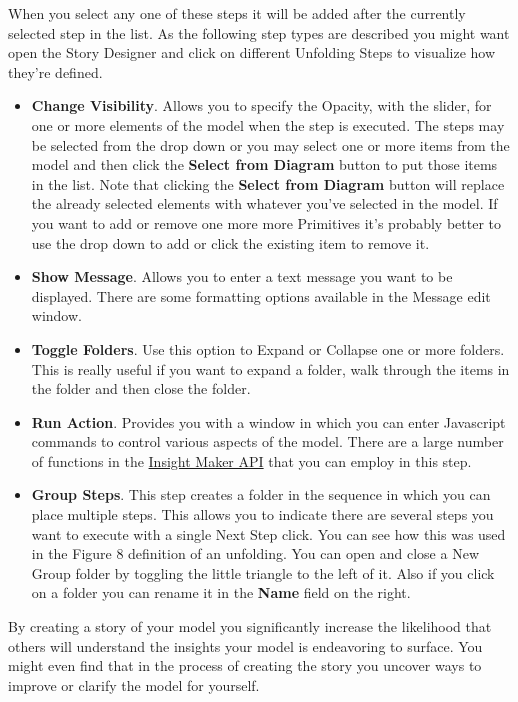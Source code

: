 \documentclass[]{memoir}
\begin{document}
When you select any one of these steps it will be added after the
currently selected step in the list. As the following step types are
described you might want open the Story Designer and click on different
Unfolding Steps to visualize how they're defined.

\begin{itemize}
\itemsep1pt\parskip0pt
\item
  \textbf{Change Visibility}. Allows you to specify the Opacity, with
  the slider, for one or more elements of the model when the step is
  executed. The steps may be selected from the drop down or you may
  select one or more items from the model and then click the
  \textbf{Select from Diagram} button to put those items in the list.
  Note that clicking the \textbf{Select from Diagram} button will
  replace the already selected elements with whatever you've selected in
  the model. If you want to add or remove one more more Primitives it's
  probably better to use the drop down to add or click the existing item
  to remove it.
\item
  \textbf{Show Message}. Allows you to enter a text message you want to
  be displayed. There are some formatting options available in the
  Message edit window.
\item
  \textbf{Toggle Folders}. Use this option to Expand or Collapse one or
  more folders. This is really useful if you want to expand a folder,
  walk through the items in the folder and then close the folder.
\item
  \textbf{Run Action}. Provides you with a window in which you can enter
  Javascript commands to control various aspects of the model. There are
  a large number of functions in the
  \href{http://insightmaker.com/sites/default/files/API/files/API-js.html}{Insight
  Maker API} that you can employ in this step.
\item
  \textbf{Group Steps}. This step creates a folder in the sequence in
  which you can place multiple steps. This allows you to indicate there
  are several steps you want to execute with a single Next Step click.
  You can see how this was used in the Figure 8 definition of an
  unfolding. You can open and close a New Group folder by toggling the
  little triangle to the left of it. Also if you click on a folder you
  can rename it in the \textbf{Name} field on the right.
\end{itemize}

By creating a story of your model you significantly increase the
likelihood that others will understand the insights your model is
endeavoring to surface. You might even find that in the process of
creating the story you uncover ways to improve or clarify the model for
yourself.
\end{document}
